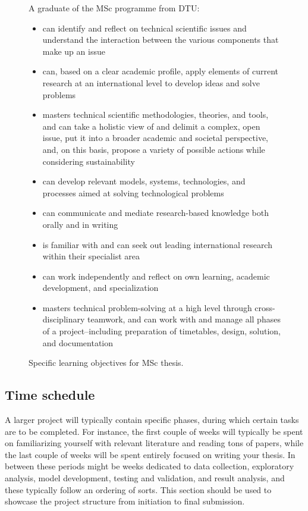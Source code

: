 \documentclass{article}
\begin{document}
\begin{figure}
    \begin{tcolorbox}[colframe=white]
    A graduate of the MSc programme from DTU:
    \begin{itemize}
        \item can identify and reflect on technical scientific issues and understand the interaction between the various components that make up an issue
        \item can, based on a clear academic profile, apply elements of current research at an international level to develop ideas and solve problems 
        \item masters technical scientific methodologies, theories, and tools, and can take a holistic view of and delimit a complex, open issue, put it into a broader academic and societal perspective, and, on this basis, propose a variety of possible actions while considering sustainability
        \item can develop relevant models, systems, technologies, and processes aimed at solving technological problems
        \item can communicate and mediate research-based knowledge both orally and in writing
        \item is familiar with and can seek out leading international research within their specialist area
        \item can work independently and reflect on own learning, academic development, and specialization
        \item masters technical problem-solving at a high level through cross-disciplinary teamwork, and can work with and manage all phases of a project--including preparation of timetables, design, solution, and documentation
    \end{itemize}
    \end{tcolorbox}
    \caption{Specific learning objectives for MSc thesis.}
    \label{msc-objectives}
\end{figure}


\subsection{Time schedule}
A larger project will typically contain specific phases, during which certain tasks are to be completed.
For instance, the first couple of weeks will typically be spent on familiarizing yourself with relevant literature and reading tons of papers, while the last couple of weeks will be spent entirely focused on writing your thesis.
In between these periods might be weeks dedicated to data collection, exploratory analysis, model development, testing and validation, and result analysis, and these typically follow an ordering of sorts.
This section should be used to showcase the project structure from initiation to final submission.
\end{document}
